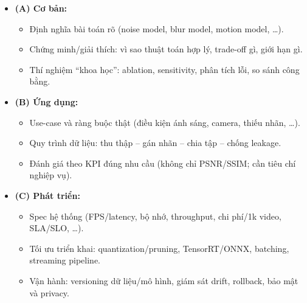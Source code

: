 \begin{itemize}
  \item \textbf{(A) Cơ bản:}
  \begin{itemize}
    \item Định nghĩa bài toán rõ (noise model, blur model, motion model, \ldots).
    \item Chứng minh/giải thích: vì sao thuật toán hợp lý, trade-off gì, giới hạn gì.
    \item Thí nghiệm ``khoa học'': ablation, sensitivity, phân tích lỗi, so sánh công bằng.
  \end{itemize}

  \item \textbf{(B) Ứng dụng:}
  \begin{itemize}
    \item Use-case và ràng buộc thật (điều kiện ánh sáng, camera, thiếu nhãn, \ldots).
    \item Quy trình dữ liệu: thu thập -- gán nhãn -- chia tập -- chống leakage.
    \item Đánh giá theo KPI đúng nhu cầu (không chỉ PSNR/SSIM; cần tiêu chí nghiệp vụ).
  \end{itemize}

  \item \textbf{(C) Phát triển:}
  \begin{itemize}
    \item Spec hệ thống (FPS/latency, bộ nhớ, throughput, chi phí/1k video, SLA/SLO, \ldots).
    \item Tối ưu triển khai: quantization/pruning, TensorRT/ONNX, batching, streaming pipeline.
    \item Vận hành: versioning dữ liệu/mô hình, giám sát drift, rollback, bảo mật và privacy.
  \end{itemize}
\end{itemize}

